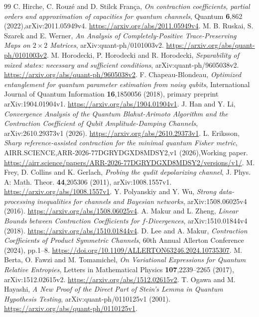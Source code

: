 \documentclass[11pt]{article}
\theoremstyle{remark}
\begin{document}
\begin{thebibliography}{99}
C. Hirche, C. Rouz\'e and D. Stilck Fran\c{c}a,
\emph{On contraction coefficients, partial orders and approximation of capacities for quantum channels},
Quantum \textbf{6},862 (2022),arXiv:2011.05949v4.
\url{https://arxiv.org/abs/2011.05949v4}.
M. B. Ruskai, S. Szarek and E. Werner,
\emph{An Analysis of Completely-Positive Trace-Preserving Maps on $2\times2$ Matrices},
arXiv:quant-ph/0101003v2. \url{https://arxiv.org/abs/quant-ph/0101003v2}.
M. Horodecki, P. Horodecki and R. Horodecki,
\emph{Separability of mixed states: necessary and sufficient conditions},
arXiv:quant-ph/9605038v2. \url{https://arxiv.org/abs/quant-ph/9605038v2}.
F. Chapeau-Blondeau,
\emph{Optimized entanglement for quantum parameter estimation from noisy qubits},
International Journal of Quantum Information \textbf{16},1850056 (2018),
primary preprint arXiv:1904.01904v1.
\url{https://arxiv.org/abs/1904.01904v1}.
J. Han and Y. Li,
\emph{Convergence Analysis of the Quantum Blahut-Arimoto Algorithm and the Contraction Coefficient of Qubit Amplitude-Damping Channels},
arXiv:2610.29373v1 (2026). \url{https://arxiv.org/abs/2610.29373v1}.
L. Eriksson,
\emph{Sharp reference-assisted contraction for the minimal quantum Fisher metric},
AIRR.SCIENCE,ARR-2026-77DGRYDGXD8MDSY2,v1 (2026),Working paper.
\url{https://airr.science/papers/ARR-2026-77DGRYDGXD8MDSY2/versions/v1/}.
M. Frey, D. Collins and K. Gerlach,
\emph{Probing the qudit depolarizing channel},
J. Phys. A: Math. Theor. \textbf{44},205306 (2011),
arXiv:1008.1557v1. \url{https://arxiv.org/abs/1008.1557v1}.
Y. Polyanskiy and Y. Wu,
\emph{Strong data-processing inequalities for channels and Bayesian networks},
arXiv:1508.06025v4 (2016).
\url{https://arxiv.org/abs/1508.06025v4}.
A. Makur and L. Zheng,
\emph{Linear Bounds between Contraction Coefficients for $f$-Divergences},
arXiv:1510.01844v4 (2018).
\url{https://arxiv.org/abs/1510.01844v4}.
D. Lee and A. Makur,
\emph{Contraction Coefficients of Product Symmetric Channels},
60th Annual Allerton Conference (2024), pp.1--8.
\url{https://doi.org/10.1109/ALLERTON63246.2024.10735307}.
M. Berta, O. Fawzi and M. Tomamichel,
\emph{On Variational Expressions for Quantum Relative Entropies},
Letters in Mathematical Physics \textbf{107},2239--2265 (2017),
arXiv:1512.02615v2. \url{https://arxiv.org/abs/1512.02615v2}.
T. Ogawa and M. Hayashi,
\emph{A New Proof of the Direct Part of Stein's Lemma in Quantum Hypothesis Testing},
arXiv:quant-ph/0110125v1 (2001).
\url{https://arxiv.org/abs/quant-ph/0110125v1}.
\end{thebibliography}
\end{document}
